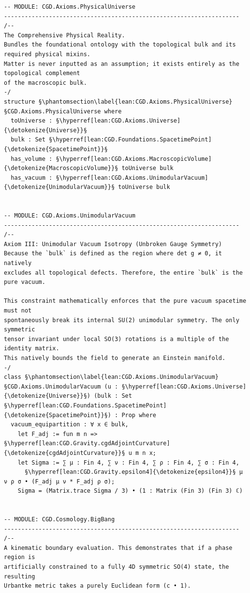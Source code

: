 \begin{verbatim}
-- MODULE: CGD.Axioms.PhysicalUniverse
--------------------------------------------------------------------
/--
The Comprehensive Physical Reality.
Bundles the foundational ontology with the topological bulk and its required physical mixins.
Matter is never inputted as an assumption; it exists entirely as the topological complement
of the macroscopic bulk.
-/
structure §\phantomsection\label{lean:CGD.Axioms.PhysicalUniverse}§CGD.Axioms.PhysicalUniverse where
  toUniverse : §\hyperref[lean:CGD.Axioms.Universe]{\detokenize{Universe}}§
  bulk : Set §\hyperref[lean:CGD.Foundations.SpacetimePoint]{\detokenize{SpacetimePoint}}§
  has_volume : §\hyperref[lean:CGD.Axioms.MacroscopicVolume]{\detokenize{MacroscopicVolume}}§ toUniverse bulk
  has_vacuum : §\hyperref[lean:CGD.Axioms.UnimodularVacuum]{\detokenize{UnimodularVacuum}}§ toUniverse bulk


-- MODULE: CGD.Axioms.UnimodularVacuum
--------------------------------------------------------------------
/--
Axiom III: Unimodular Vacuum Isotropy (Unbroken Gauge Symmetry)
Because the `bulk` is defined as the region where det g ≠ 0, it natively
excludes all topological defects. Therefore, the entire `bulk` is the pure vacuum.

This constraint mathematically enforces that the pure vacuum spacetime must not
spontaneously break its internal SU(2) unimodular symmetry. The only symmetric
tensor invariant under local SO(3) rotations is a multiple of the identity matrix.
This natively bounds the field to generate an Einstein manifold.
-/
class §\phantomsection\label{lean:CGD.Axioms.UnimodularVacuum}§CGD.Axioms.UnimodularVacuum (u : §\hyperref[lean:CGD.Axioms.Universe]{\detokenize{Universe}}§) (bulk : Set §\hyperref[lean:CGD.Foundations.SpacetimePoint]{\detokenize{SpacetimePoint}}§) : Prop where
  vacuum_equipartition : ∀ x ∈ bulk,
    let F_adj := fun m n => §\hyperref[lean:CGD.Gravity.cgdAdjointCurvature]{\detokenize{cgdAdjointCurvature}}§ u m n x;
    let Sigma := ∑ μ : Fin 4, ∑ ν : Fin 4, ∑ ρ : Fin 4, ∑ σ : Fin 4,
      §\hyperref[lean:CGD.Gravity.epsilon4]{\detokenize{epsilon4}}§ μ ν ρ σ • (F_adj μ ν * F_adj ρ σ);
    Sigma = (Matrix.trace Sigma / 3) • (1 : Matrix (Fin 3) (Fin 3) ℂ)


-- MODULE: CGD.Cosmology.BigBang
--------------------------------------------------------------------
/--
A kinematic boundary evaluation. This demonstrates that if a phase region is 
artificially constrained to a fully 4D symmetric SO(4) state, the resulting 
Urbantke metric takes a purely Euclidean form (c • 1).


\end{verbatim}
